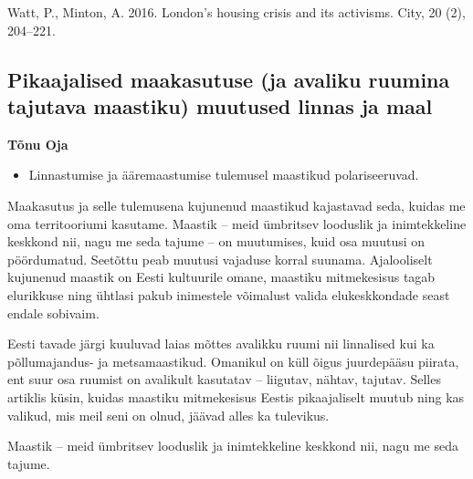 \documentclass[estonian,]{article}
\providecommand{\tightlist}{%
  \setlength{\itemsep}{0pt}\setlength{\parskip}{0pt}}
\begin{document}
Watt, P., Minton, A. 2016. London's housing crisis and its activisms. City, 20 (2), 204--221.

\hypertarget{pikaajalised-maakasutuse-ja-avaliku-ruumina-tajutava-maastiku-muutused-linnas-ja-maal}{%
\subsection{Pikaajalised maakasutuse (ja avaliku ruumina tajutava maastiku) muutused linnas ja maal}\label{pikaajalised-maakasutuse-ja-avaliku-ruumina-tajutava-maastiku-muutused-linnas-ja-maal}}

\begin{authors}
\textbf{Tõnu Oja}
\end{authors}

\begin{points}
\begin{itemize}
\tightlist
\item
  Linnastumise ja ääremaastumise tulemusel maastikud polariseeruvad.
\end{itemize}
\end{points}

Maakasutus ja selle tulemusena kujunenud maastikud kajastavad seda, kuidas me oma territooriumi kasutame. Maastik -- meid ümbritsev looduslik ja inimtekkeline keskkond nii, nagu me seda tajume -- on muutumises, kuid osa muutusi on pöördumatud. Seetõttu peab muutusi vajaduse korral suunama. Ajalooliselt kujunenud maastik on Eesti kultuurile omane, maastiku mitmekesisus tagab elurikkuse ning ühtlasi pakub inimestele võimalust valida elukeskkondade seast endale sobivaim.

Eesti tavade järgi kuuluvad laias mõttes avalikku ruumi nii linnalised kui ka põllumajandus- ja metsamaastikud. Omanikul on küll õigus juurdepääsu piirata, ent suur osa ruumist on avalikult kasutatav -- liigutav, nähtav, tajutav. Selles artiklis küsin, kuidas maastiku mitmekesisus Eestis pikaajaliselt muutub ning kas valikud, mis meil seni on olnud, jäävad alles ka tulevikus.

\begin{blockquote-right}
Maastik -- meid ümbritsev looduslik ja inimtekkeline keskkond nii, nagu
me seda tajume.
\end{blockquote-right}
\end{document}
